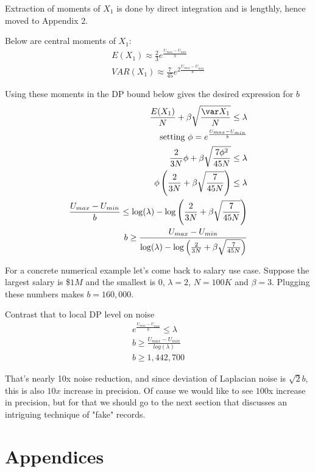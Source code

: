 \documentclass[11pt]{article}
\begin{document}
Extraction of moments of $X_1$ is done by direct integration and is lengthly, hence moved to Appendix 2.  

Below are central moments of $X_1$:
\begin{align}
 E(X_1)  \approx  \frac{2}{3}e^{\frac{U_{max} - U_{min}}{b}}  \\
  VAR(X_1)\approx  \frac{7}{45} e^{2\frac{U_{max} - U_{min}}{b}} 
 \end{align}
 
 Using these moments in the DP bound below gives the desired expression for $b$
 \begin{align}
\frac{E(X_1)}{N} + \beta \sqrt{ \frac{\var X_1}{N}} \le \lambda \\
\text{setting } \phi = e^{\frac{U_{max} - U_{min}}{b}} \\ 
 \frac{2}{3N}\phi +  \beta \sqrt{ \frac{7 \phi^2}{45 N}} \le \lambda  \\
\phi \left (   \frac{2}{3N} +   \beta \sqrt{ \frac{7}{45 N} } \right ) \le \lambda \\ 
 \frac{U_{max} - U_{min}}{b}  \le \log(\lambda) - \log \left (   \frac{2}{3N} +   \beta \sqrt{ \frac{7}{45 N} } \right )  \\
 b \ge  \frac{U_{max} - U_{min}} {  \log(\lambda) - \log \left (   \frac{2}{3N} +   \beta \sqrt{ \frac{7}{45 N} } \right ) }
 \end{align}
 
For a concrete numerical example let's come back to salary use case.  Suppose the largest salary is \$$1M$ and the smallest is $0$, $\lambda=2$, $N=100K$ and $\beta=3$.  Plugging these numbers makes $b=160,000$.   

Contrast that to local DP level on noise
 \begin{align}
 e^{\frac{U_{max} - U_{min}}{b}} \le \lambda \\
b \ge  \frac{U_{max} - U_{min}}{log(\lambda)} \\
b \ge 1,442,700
 \end{align}
 
 That's nearly 10x noise reduction, and since deviation of Laplacian noise is $\sqrt{2} b$, this is also $10x$ increase in precision.  Of cause we would like to see $100$x increase in precision, but for that we should go to the next section that discusses an intriguing technique of "fake" records.
 
\section{Appendices}
\end{document}
